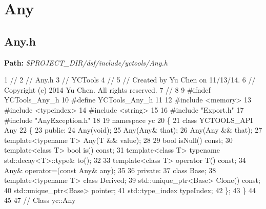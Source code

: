 \hypertarget{yctools_yctoolsAny}{}\section{Any}\label{yctools_yctoolsAny}
\hypertarget{yctools_yctoolsAny_h}{}\subsection{Any.\+h}\label{yctools_yctoolsAny_h}
{\bfseries Path\+:} {\itshape \$\+P\+R\+O\+J\+E\+C\+T\+\_\+\+D\+I\+R/dsf/include/yctools/\+Any.h} 
\begin{DoxyCodeInclude}
1 \textcolor{comment}{//}
2 \textcolor{comment}{//  Any.h}
3 \textcolor{comment}{//  YCTools}
4 \textcolor{comment}{//}
5 \textcolor{comment}{//  Created by Yu Chen on 11/13/14.}
6 \textcolor{comment}{//  Copyright (c) 2014 Yu Chen. All rights reserved.}
7 \textcolor{comment}{//}
8 
9 \textcolor{preprocessor}{#ifndef YCTools\_Any\_h}
10 \textcolor{preprocessor}{#define YCTools\_Any\_h}
11 
12 \textcolor{preprocessor}{#include <memory>}
13 \textcolor{preprocessor}{#include <typeindex>}
14 \textcolor{preprocessor}{#include <string>}
15 
16 \textcolor{preprocessor}{#include "Export.h"}
17 \textcolor{preprocessor}{#include "AnyException.h"}
18 
19 \textcolor{keyword}{namespace }yc
20 \{
21     \textcolor{keyword}{class }YCTOOLS\_API Any
22     \{
23     \textcolor{keyword}{public}:
24         Any(\textcolor{keywordtype}{void});
25         Any(Any& that);
26         Any(Any && that);
27         \textcolor{keyword}{template}<\textcolor{keyword}{typename} T> Any(T && value);
28         
29         \textcolor{keywordtype}{bool} isNull() \textcolor{keyword}{const};
30         \textcolor{keyword}{template}<\textcolor{keyword}{class} T> \textcolor{keywordtype}{bool} is() \textcolor{keyword}{const};
31         \textcolor{keyword}{template}<\textcolor{keyword}{class} T> \textcolor{keyword}{typename} std::decay<T>::type& to();
32         
33         \textcolor{keyword}{template}<\textcolor{keyword}{class} T> \textcolor{keyword}{operator} T() \textcolor{keyword}{const};
34         Any& operator=(\textcolor{keyword}{const} Any& any);
35         
36     \textcolor{keyword}{private}:
37         \textcolor{keyword}{class }Base;
38         \textcolor{keyword}{template}<\textcolor{keyword}{typename} T> \textcolor{keyword}{class }Derived;
39         std::unique\_ptr<Base> Clone() \textcolor{keyword}{const};
40         std::unique\_ptr<Base> pointer;
41         std::type\_index typeIndex;
42     \};
43 \}
44 
45 
47 \textcolor{comment}{//  Class yc::Any}

\end{DoxyCodeInclude}
